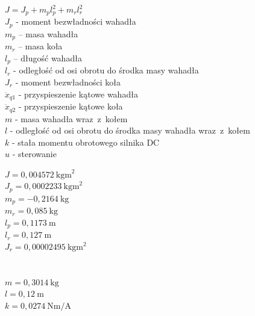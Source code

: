 \documentclass[11pt]{mwart}
\begin{document}
\noindent\begin{minipage}[t]{0.75\columnwidth}
	$J=J_{p}+m_{p}l_{p}^{2}+m_{r}l_{r}^{2}$ \\
	$J_{p}$ - moment bezwładności wahadła \\
	$m_{p}$ – masa wahadła \\
	$m_{r}$ – masa koła \\
	$l_{p}$ – długość wahadła \\
	$l_{r}$ - odległość od osi obrotu do środka masy wahadła \\
	$J_{r}$ - moment bezwładności koła \\
	$\ddot{x}_{q1}$ - przyspieszenie kątowe wahadła \\
	$\ddot{x}_{q2}$ - przyspieszenie kątowe koła\\
	$m$ - masa wahadła wraz~z~kołem\\
	$l$ - odległość od osi obrotu do środka masy wahadła wraz~z~kołem \\
	$k$ - stała momentu obrotowego silnika DC \\
	$u$ - sterowanie
\end{minipage}
\begin{minipage}[t]{0.25\columnwidth}
	$J=0,004572\ \textrm{kgm}^2$ \\
	$J_{p}=0,0002233\ \textrm{kgm}^2$ \\
	$m_{p}=-0,2164\ \textrm{kg}$ \\
	$m_{r}=0,085\ \textrm{kg}$ \\
	$l_{p}=0,1173\ \textrm{m}$ \\
	$l_{r}=0,127\ \textrm{m}$ \\
	$J_{r}=0,00002495\ \textrm{kgm}^2$ \\
	\\
	\\
	$m=0,3014\ \textrm{kg}$ \\
	$l=0,12\ \textrm{m}$\\
	$k=0,0274\ \textrm{Nm/A}$ \\
	\\
\end{minipage}
\end{document}
